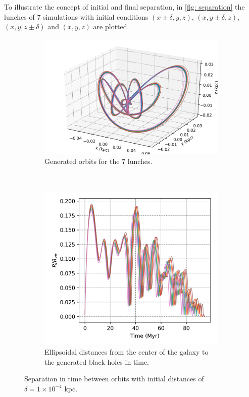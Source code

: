 	To illustrate the concept of initial and final separation, in \autoref{fig: separation} the lunches of 7 simulations with initial conditions $(x \pm \delta, y, z)$, $(x, y \pm \delta, z)$, $(x, y, z \pm \delta)$ and $(x, y, z)$ are plotted.
	
	\begin{figure}[h]
		\centering
		\begin{subfigure}[b]{0.49\textwidth}
			\includegraphics[width = \textwidth]{"../Files/Week 11/lyapunov_orbits"}
			\caption{Generated orbits for the 7 lunches.}
		\end{subfigure}
		~ 
		\begin{subfigure}[b]{0.4\textwidth}
			\includegraphics[width=\textwidth]{"../Files/Week 11/lyapunov_distances"}
			\caption{Ellipsoidal distances from the center of the galaxy to the generated black holes in time.}
		\end{subfigure}
		\caption{Separation in time between orbits with initial distances of $\delta = 1\times10^{-4}$ kpc.}
		\label{fig: separation}
	\end{figure}